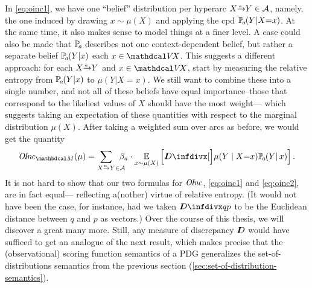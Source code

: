 In \eqref{eq:oinc1}, 
we have one ``belief'' distribution per hyperarc $\ed aXY \in \Ar$, 
namely, the one induced by drawing $x \sim \mu(X)$ and applying 
the cpd $\p_a(Y|X{=}x)$. 
%
At the same time, it also makes sense to model things at a finer level.
A case could also be made that $\p_a$ describes not one context-dependent belief, but rather a separate belief $\p_a(Y|x)$ each 
$x \in \V\!X$.
This suggests a different approach:
for each $\ed aXY$ and $x \in \V\!X$, start by measuring
the relative entropy from $\p_a(Y|x)$ to $\mu(Y|X{=}x)$.
We still want to combine these into a single number, 
and not all of these beliefs have equal importance--those
that correspond to the likeliest values of $X$ should have the most weight---%
which suggests taking an expectation of these quantities with respect to the marginal distribution $\mu(X)$.
After taking a weighted sum over arcs as before, we would get the quantity
\begin{equation}
    \OInc_{\dg M }( \mu ) = 
        \sum_{\ed aXY \mathrlap{\in \Ar}}~ \beta_a \cdot \Ex_{x \sim \mu(X)} 
        \left[\kldiv[\Big]{ \mu(Y \mid X {=} x) }{\p_a(Y|\,x) } \right]
    .
        \label{eq:oinc2}
\end{equation}
It is not hard to show that our two formulas for $\mathit{O\mskip-2.5muI\mskip-3.5mun\mskip-1.7muc}$, 
\eqref{eq:oinc1} and \eqref{eq:oinc2}, are in fact equal---%
reflecting a(nother) virtue of relative entropy.
%
%
(It would not have been the case, for instance, had we taken $\kldiv {q}{p}$ to be the Euclidean distance between $q$ and $p$ as vectors.)
Over the course of this thesis, we will discover a great many more. 
Still, any measure of discrepancy $I\mkern-8muD$ would have sufficed to get
an analogue of the next result, which makes precise that
    the (observational) scoring function semantics of a PDG
    generalizes the set-of-distributions semantics from 
    the previous section (\ref{sec:set-of-distribution-semantics}).

